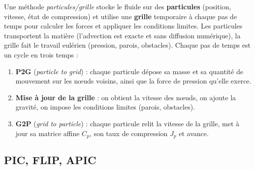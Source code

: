 \documentclass[11pt,a4paper]{article}
\begin{document}
Une méthode \emph{particules/grille} stocke le fluide sur des \textbf{particules} (position, vitesse,
état de compression) et utilise une \textbf{grille} temporaire à chaque pas de temps pour calculer
les forces et appliquer les conditions limites. Les particules transportent la matière
(l'advection est exacte et sans diffusion numérique), la grille fait le travail eulérien
(pression, parois, obstacles). Chaque pas de temps est un cycle en trois temps :

\begin{center}
\end{center}

\begin{enumerate}
  \item \textbf{P2G} (\emph{particle to grid}) : chaque particule dépose sa masse et sa quantité
        de mouvement sur les n\oe uds voisins, ainsi que la force de pression qu'elle exerce.
  \item \textbf{Mise à jour de la grille} : on obtient la vitesse des n\oe uds, on ajoute la gravité,
        on impose les conditions limites (parois, obstacles).
  \item \textbf{G2P} (\emph{grid to particle}) : chaque particule relit la vitesse de la grille,
        met à jour sa matrice affine $C_p$, son taux de compression $J_p$ et avance.
\end{enumerate}

\subsection{PIC, FLIP, APIC}
\end{document}

